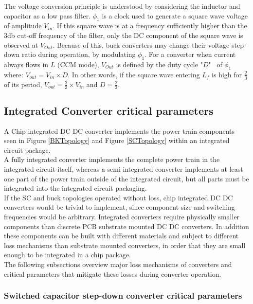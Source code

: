 \documentclass[letterpaper,twocolumn,10pt]{article}
\begin{document}
The voltage conversion principle is understood by considering the inductor and capacitor as a low pass filter. $\phi_1$ is a clock used to generate a square wave voltage of amplitude $V_{in}$. If this square wave is at a frequency sufficiently higher than the 3db cut-off frequency of the filter, only the DC component of the square wave is observed at $V_{Out}$. Because of this, buck converters may change their voltage step-down ratio during operation, by modulating $\phi_1$. For a converter when current always flows in $L$ (CCM mode), $V_{Out}$ is defined by the duty cycle "$D$"~\cite{Kurson2006} of $\phi_1$ where: $V_{out} = V_{in} \times D$. In other words, if the square wave entering $L_f$ is high for $\frac{2}{3}$ of its period, $V_{out} = \frac{2}{3}\times V_{in}$ and $D = \frac{2}{3}$.\\ 

\subsection{Integrated Converter critical parameters}

A Chip integrated DC DC converter implements the power train components seen in Figure \ref{BKTopology} and Figure \ref{SCTopology} within an integrated circuit package.\\
A fully integrated converter implements the complete power train in the integrated circuit itself, whereas a semi-integrated converter implements at least one part of the power train outside of the integrated circuit, but all parts must be integrated into the integrated circuit packaging.\\
If the SC and buck topologies operated without loss, chip integrated DC DC converters would be trivial to implement, since component size and switching frequencies would be arbitrary. Integrated converters require physically smaller components than discrete PCB substrate mounted DC DC converters. In addition these components can be built with different materials and subject to different loss mechanisms than substrate mounted converters, in order that they are small enough to be integrated in a chip package.\\
The following subsections overview major loss mechanisms of converters and critical parameters that mitigate these losses during converter operation.

\subsubsection{Switched capacitor step-down converter critical parameters}
\end{document}
